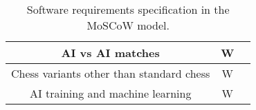 \begin{table}[H]
{\begin{tabular}{ccc}
            \\ \midrule
            AI vs AI matches                         & W                        & {\ul~\ref{subsec:ai-engines}}
            \\ \midrule
            Chess variants other than standard chess & W                        & {\ul~\ref{sec:chess}}
            \\ \midrule
            AI training and machine learning         & W                        & {\ul~\ref{subsec:ai-engines}}
            \\ \bottomrule
        \end{tabular}%
    }
    \caption{Software requirements specification in the MoSCoW model.}\label{tab:srs}
\end{table}
